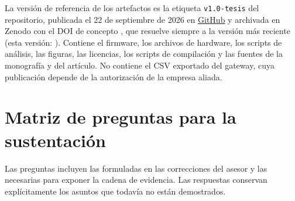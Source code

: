 La versión de referencia de los artefactos es la etiqueta \texttt{v1.0-tesis} del repositorio, publicada el 22 de septiembre de 2026 en \href{https://github.com/DavidSPuentesc/SmartSense-Monitoring}{GitHub} y archivada en Zenodo con el DOI de concepto \href{https://doi.org/10.5281/zenodo.22903028}{\DOIZenodo{}}, que resuelve siempre a la versión más reciente (esta versión: \DOIZenodoVuno{}). Contiene el firmware, los archivos de hardware, los scripts de análisis, las figuras, las licencias, los scripts de compilación y las fuentes de la monografía y del artículo. No contiene el CSV exportado del gateway, cuya publicación depende de la autorización de la empresa aliada.


\section{Matriz de preguntas para la sustentación}
\label{sec:anexos-sustentacion}

Las preguntas incluyen las formuladas en las correcciones del asesor y las necesarias para exponer la cadena de evidencia. Las respuestas conservan explícitamente los asuntos que todavía no están demostrados.

